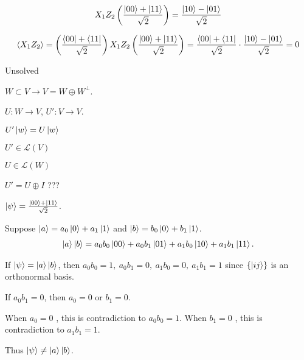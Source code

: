 \begin{align*}
     X_1 Z_2 \left(\frac{\ket{00} + \ket{11}}{\sqrt{2}} \right) = \frac{\ket{10} - \ket{01}}{\sqrt{2}}
\end{align*}


\begin{align*}
     \braket{X_1 Z_2} = \left(\frac{\bra{00} + \bra{11}}{\sqrt{2}} \right) X_1 Z_2 \left(\frac{\ket{00} + \ket{11}}{\sqrt{2}} \right)
    = \frac{\bra{00} + \bra{11}}{\sqrt{2}}  \cdot \frac{\ket{10} - \ket{01}}{\sqrt{2}}
    = 0
\end{align*}




Unsolved

$W \subset V \rightarrow V = W \oplus W^\perp$.

$U: W \rightarrow V$, $U': V \rightarrow V$.

$U' \ket{w} = U\ket{w}$

$U' \in \mathcal{L}(V)$

$U \in \mathcal{L}(W)$

$U' = U \oplus I$ ???



$\ket{\psi} = \frac{\ket{00} + \ket{11}}{\sqrt{2}}$.

Suppose $\ket{a} = a_0 \ket{0}  + a_1\ket{1}$ and $\ket{b} = b_0 \ket{0}  + b_1\ket{1}$.
%
\begin{align*}
    \ket{a} \ket{b} = a_0 b_0 \ket{00} + a_0 b_1 \ket{01} + a_1 b_0 \ket{10} + a_1 b_1 \ket{11}.
\end{align*}

If $\ket{\psi} = \ket{a} \ket{b}$, then $a_0 b_0 = 1,~ a_0 b_1=0,~ a_1 b_0 = 0,~ a_1 b_1 = 1$ since $\{\ket{ij}\}$ is an orthonormal basis.

If $a_0 b_1 = 0$, then $a_0 = 0$ or $b_1 = 0$.

When $a_0 = 0$ , this is contradiction to $a_0 b_0 = 1$.
When $b_1 = 0$ , this is contradiction to $a_1 b_1 = 1$.

Thus $\ket{\psi} \neq \ket{a} \ket{b}$.



